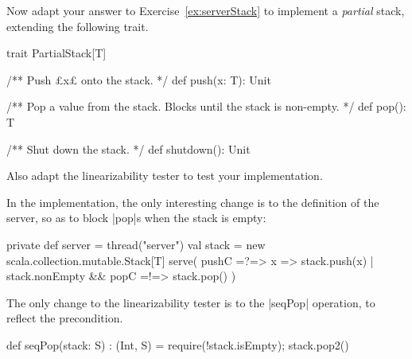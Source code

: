 \begin{questionS}
Now adapt your answer to Exercise~\ref{ex:serverStack} to implement a
\emph{partial} stack, extending the following trait.
%
\begin{scala}
trait PartialStack[T]{
  /** Push £x£ onto the stack. */
  def push(x: T): Unit

  /** Pop a value from the stack.  Blocks until the stack is non-empty. */
  def pop(): T

  /** Shut down the stack. */
  def shutdown(): Unit
}
\end{scala}
%
Also adapt the linearizability tester to test your implementation.
\end{questionS}


\begin{answerS}
In the implementation, the only interesting change is to the definition of the
server, so as to block |pop|s when the stack is empty:
%
\begin{scala}
  private def server = thread("server"){
    val stack = new scala.collection.mutable.Stack[T]
    serve(
      pushC =?=> { x => stack.push(x) }
      | stack.nonEmpty && popC =!=> stack.pop()
    )
  }
\end{scala}

The only change to the linearizability tester is to the |seqPop| operation, to
reflect the precondition. 
%
\begin{scala}
  def seqPop(stack: S) : (Int, S) = {
    require(!stack.isEmpty); stack.pop2()
  }
\end{scala}
\end{answerS}
